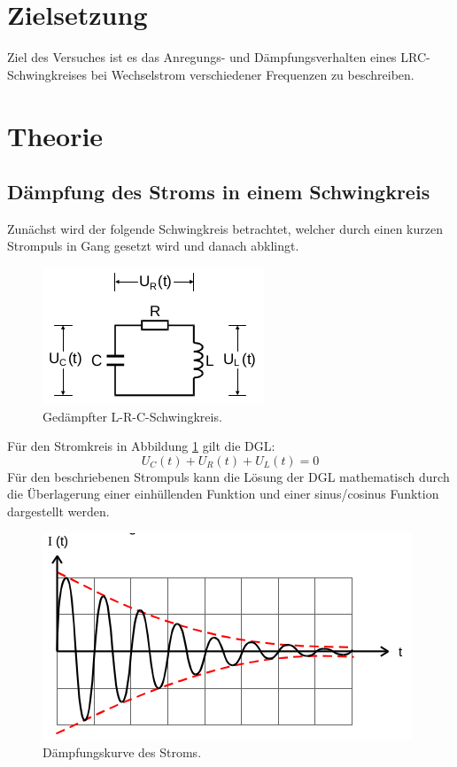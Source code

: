 \section{Zielsetzung}
\label{sec:Zielsetzung}

Ziel des Versuches ist es das Anregungs- und Dämpfungsverhalten eines LRC-Schwingkreises
bei Wechselstrom verschiedener Frequenzen zu beschreiben.


\section{Theorie}
\label{sec:Theorie}

\subsection{Dämpfung des Stroms in einem Schwingkreis}

Zunächst wird der folgende Schwingkreis betrachtet, welcher durch einen
kurzen Strompuls in Gang gesetzt wird und danach abklingt.

\begin{figure}[H]
  \centering
  \includegraphics{content/images/V354.png}
  \caption{Gedämpfter L-R-C-Schwingkreis.}
  \label{fig:schwingkreis}
\end{figure}

Für den Stromkreis in Abbildung \ref{fig:schwingkreis} gilt die
DGL:
\begin{equation}
  U_C(t)+U_R(t)+U_L(t)=0
\end{equation}
Für den beschriebenen Strompuls kann die Lösung der DGL mathematisch durch die Überlagerung einer
einhüllenden Funktion und einer sinus/cosinus Funktion dargestellt werden.

\begin{figure}[H]
  \centering
  \includegraphics{content/images/dia.png}
  \caption{Dämpfungskurve des Stroms.}
  \label{fig:daempfung}
\end{figure}


